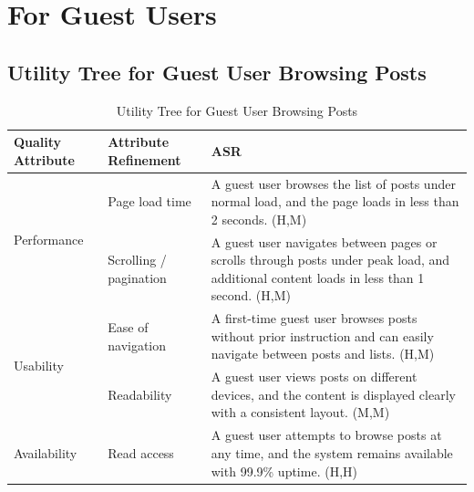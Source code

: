 \documentclass{article}
\begin{document}
\section{For Guest Users}

\subsection{Utility Tree for Guest User Browsing Posts}

\begin{table}[H]
    \centering
    \caption{Utility Tree for Guest User Browsing Posts}
    \begin{tabular}{|p{3cm}|p{4cm}|p{7cm}|}
        \hline
        \textbf{Quality Attribute} & \textbf{Attribute Refinement}                                                                                                                      & \textbf{ASR} \\
        \hline

        \multirow{2}{*}{Performance}
                                   & Page load time
                                   & A guest user browses the list of posts under normal load, and the page loads in less than 2 seconds. (H,M)                                                        \\
        \cline{2-3}
                                   & Scrolling / pagination
                                   & A guest user navigates between pages or scrolls through posts under peak load, and additional content loads in less than 1 second. (H,M)                          \\
        \hline

        \multirow{2}{*}{Usability}
                                   & Ease of navigation
                                   & A first-time guest user browses posts without prior instruction and can easily navigate between posts and lists. (H,M)                                            \\
        \cline{2-3}
                                   & Readability
                                   & A guest user views posts on different devices, and the content is displayed clearly with a consistent layout. (M,M)                                               \\
        \hline

        Availability
                                   & Read access
                                   & A guest user attempts to browse posts at any time, and the system remains available with 99.9\% uptime. (H,H)                                                     \\
        \hline


\end{tabular}
\end{table}
\end{document}

